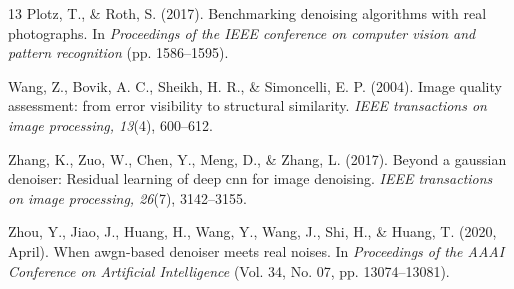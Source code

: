 \documentclass[11pt]{article}
\begin{document}
\begin{thebibliography}{13}
Plotz, T., \& Roth, S. (2017). Benchmarking denoising algorithms with real photographs.
In \emph{Proceedings of the IEEE conference on computer vision and pattern recognition}
(pp. 1586--1595).

Wang, Z., Bovik, A. C., Sheikh, H. R., \& Simoncelli, E. P. (2004). Image quality
assessment: from error visibility to structural similarity. \emph{IEEE transactions on
image processing, 13}(4), 600--612.

Zhang, K., Zuo, W., Chen, Y., Meng, D., \& Zhang, L. (2017). Beyond a gaussian denoiser:
Residual learning of deep cnn for image denoising. \emph{IEEE transactions on image
processing, 26}(7), 3142--3155.

Zhou, Y., Jiao, J., Huang, H., Wang, Y., Wang, J., Shi, H., \& Huang, T. (2020, April).
When awgn-based denoiser meets real noises. In \emph{Proceedings of the AAAI Conference
on Artificial Intelligence} (Vol. 34, No. 07, pp. 13074--13081).
\end{thebibliography}
\end{document}
